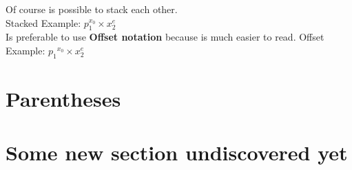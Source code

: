 \documentclass{article}
\begin{document}
        Of course is possible to stack each other. \\
        Stacked Example: \( \displaystyle p_1^{x_0} \times x^e_2 \) \\
        Is preferable to use \textbf{Offset notation} because is much easier to read.
        Offset Example: \( \displaystyle {p_1}^{x_0} \times x^e_2 \) \\


    \section{Parentheses}
        


    \section{Some new section undiscovered yet}
\end{document}
